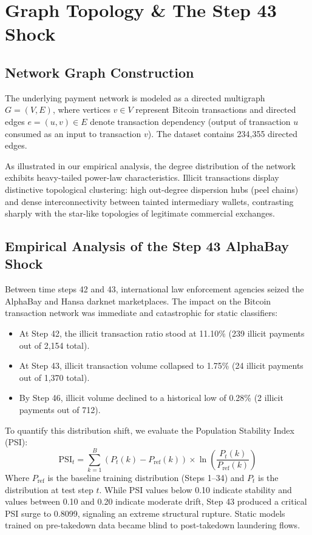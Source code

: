 \documentclass[conference]{IEEEtran}
\begin{document}
\section{Graph Topology \& The Step 43 Shock}
\subsection{Network Graph Construction}
The underlying payment network is modeled as a directed multigraph $G = (V, E)$, where vertices $v \in V$ represent Bitcoin transactions and directed edges $e = (u, v) \in E$ denote transaction dependency (output of transaction $u$ consumed as an input to transaction $v$). The dataset contains 234,355 directed edges.

As illustrated in our empirical analysis, the degree distribution of the network exhibits heavy-tailed power-law characteristics. Illicit transactions display distinctive topological clustering: high out-degree dispersion hubs (peel chains) and dense interconnectivity between tainted intermediary wallets, contrasting sharply with the star-like topologies of legitimate commercial exchanges.

\subsection{Empirical Analysis of the Step 43 AlphaBay Shock}
Between time steps 42 and 43, international law enforcement agencies seized the AlphaBay and Hansa darknet marketplaces. The impact on the Bitcoin transaction network was immediate and catastrophic for static classifiers:
\begin{itemize}
    \item At Step 42, the illicit transaction ratio stood at 11.10\% (239 illicit payments out of 2,154 total).
    \item At Step 43, illicit transaction volume collapsed to 1.75\% (24 illicit payments out of 1,370 total).
    \item By Step 46, illicit volume declined to a historical low of 0.28\% (2 illicit payments out of 712).
\end{itemize}

To quantify this distribution shift, we evaluate the Population Stability Index (PSI):
\begin{equation}
\text{PSI}_t = \sum_{k=1}^{B} \left( P_t(k) - P_{\text{ref}}(k) \right) \times \ln\left(\frac{P_t(k)}{P_{\text{ref}}(k)}\right)
\end{equation}
Where $P_{\text{ref}}$ is the baseline training distribution (Steps 1--34) and $P_t$ is the distribution at test step $t$. While PSI values below 0.10 indicate stability and values between 0.10 and 0.20 indicate moderate drift, Step 43 produced a critical PSI surge to 0.8099, signaling an extreme structural rupture. Static models trained on pre-takedown data became blind to post-takedown laundering flows.
\end{document}
